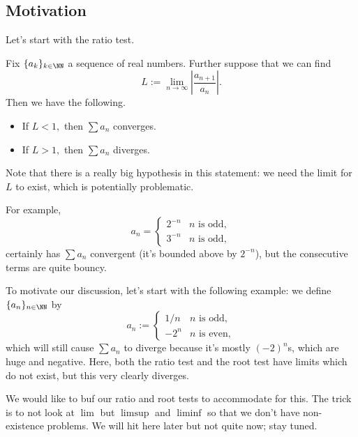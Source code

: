 \documentclass[../notes.tex]{subfiles}
\begin{document}
\subsection{Motivation}
Let's start with the ratio test.
\begin{proposition}
	Fix $\{a_k\}_{k\in\NN}$ a sequence of real numbers. Further suppose that we can find
	\[L:=\lim_{n\to\infty}\left|\frac{a_{n+1}}{a_n}\right|.\]
	Then we have the following.
	\begin{itemize}
		\item If $L<1,$ then $\sum a_n$ converges.
		\item If $L>1,$ then $\sum a_n$ diverges.
	\end{itemize}
\end{proposition}
Note that there is a really big hypothesis in this statement: we need the limit for $L$ to exist, which is potentially problematic.
\begin{example}
	For example,
	\[a_n=\begin{cases}
		2^{-n} & n\text{ is odd}, \\
		3^{-n} & n\text{ is odd},
	\end{cases}\]
	certainly has $\sum a_n$ convergent (it's bounded above by $2^{-n}$), but the consecutive terms are quite bouncy.
\end{example}
To motivate our discussion, let's start with the following example: we define $\{a_n\}_{n\in\NN}$ by
\[a_n:=\begin{cases}
	1/n & n\text{ is odd}, \\
	-2^n & n\text{ is even},
\end{cases}\]
which will still cause $\sum a_n$ to diverge because it's mostly $(-2)^n$s, which are huge and negative. Here, both the ratio test and the root test have limits which do not exist, but this very clearly diverges.

We would like to buf our ratio and root tests to accommodate for this. The trick is to not look at $\lim$ but $\limsup$ and $\liminf$ so that we don't have non-existence problems. We will hit here later but not quite now; stay tuned.
\end{document}
